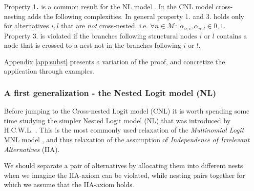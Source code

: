 Property \textbf{1.} is a common result for the NL model \citep{train_discrete_2009}. In the CNL model cross-nesting adds the following complexities. In general property 1. and 3. holds only for alternatives $i,l$ that are \textit{not} cross-nested, i.e. $\forall n\in\mathcal{M}:\ \alpha_{n,i},\alpha_{n,l}\in0,1$. Property 3. is violated if the branches following structural nodes $i$ or $l$ contains a node that is crossed to a nest not in the branches following $i$ or $l$.

Appendix \ref{app:subst} presents a variation of the proof, and concretize the application through examples.


\subsubsection{A first generalization - the Nested Logit model (NL)}
Before jumping to the Cross-nested Logit model (CNL) it is worth spending some time studying the simpler Nested Logit model (NL) that was introduced by H.C.W.L. \citet{williams_formation_1977}. This is the most commonly used relaxation of the \textit{Multinomial Logit} MNL model \citep{koppelman_self_2006}, and thus relaxation of the assumption of \textit{Independence of Irrelevant Alternatives} (IIA).

We should separate a pair of alternatives by allocating them into different nests when we imagine the IIA-axiom can be violated, while nesting pairs together for which we assume that the IIA-axiom holds.

